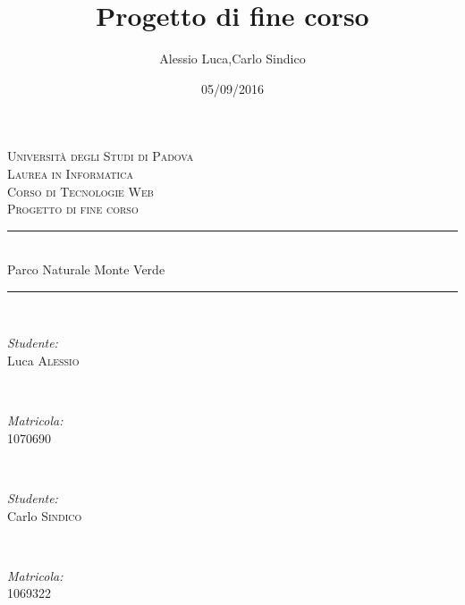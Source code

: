 \documentclass[12pt]{article}
\title{Progetto di fine corso}
\date{05/09/2016}
\author{Alessio Luca,Carlo Sindico}
\begin{document}
	
	\begin{titlepage}
		\newcommand{\HRule}{\rule{\linewidth}{0.5mm}}%
		\center
		
		\textsc{\LARGE Universit\`a degli Studi di Padova}\\[1.5cm] 
		\textsc{\Large Laurea in Informatica}\\[0.5cm]
		\textsc{\large Corso di Tecnologie Web}\\[0.5cm]
		\textsc{\large Progetto di fine corso}\\[0.5cm]
		
		
		\HRule \\[0.4cm]
		{ \huge  Parco Naturale Monte Verde}\\[0.3cm] 
		\HRule \\[0.4cm]
		
		
		
		\begin{minipage}{0.3\textwidth}
			\begin{flushleft} \large
				\emph{Studente:}\\
				Luca \textsc{Alessio} %
			\end{flushleft}
		\end{minipage}
		~
		\begin{minipage}{0.3\textwidth}
			\begin{flushright} \large
				\emph{Matricola:} \\
				\textsc{1070690} %
			\end{flushright}
		\end{minipage}\\[1cm]
		
			\begin{minipage}{0.3\textwidth}
				\begin{flushleft} \large
					\emph{Studente:}\\
					Carlo \textsc{Sindico} %
				\end{flushleft}
			\end{minipage}
			~
			\begin{minipage}{0.3\textwidth}
				\begin{flushright} \large
					\emph{Matricola:} \\
					\textsc{1069322} %
				\end{flushright}
			\end{minipage}\\[1cm]
			

\end{titlepage}
\end{document}
